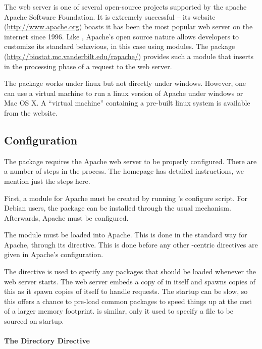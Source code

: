 The  web server is one of several open-source projects
supported by the apache Apache Software Foundation. It is extremely
successful -- its website (\url{http://www.apache.org}) boasts it has
been the most popular web server on the internet since 1996. Like \R,
Apache's open source nature allows developers to customize its
standard behavious, in this case using modules. The 
package (\url{http://biostat.mc.vanderbilt.edu/rapache/}) provides
such a module that inserts \R\/ in the processing phase of a request
to the web server.

The  package works under linux but not directly under
windows. However, one can use a virtual machine to run a linux version
of Apache under windows or Mac OS X. A ``virtual machine'' containing
a pre-built linux system is available from the  website.

\subsection{Configuration}
\label{sec:configuration}

The  package requires the Apache web server to be
properly configured. There are a number of steps in the process.
The  homepage has detailed instructions, we mention just
the steps here.

First, a module for Apache must be created by running 's
configure script. For Debian users, the package can be installed
through the usual mechanism.
Afterwards, Apache must be configured.

The \R\/ module must be loaded into Apache. This is done in the
standard way for Apache, through its  directive. This
is done before any other \R-centric directives are given in Apache's configuration.

The  directive is used to specify any packages
that should be loaded whenever the web server starts. The web server
embeds a copy of \R\/ in itself and spawns copies of this as it spawn
copies of itself to handle requests. The startup can be slow, so this
offers a chance to pre-load common packages to speed things up at the
cost of a larger memory footprint.  is similar,
only it used to specify a file to be sourced on startup.

\paragraph{The Directory Directive}

